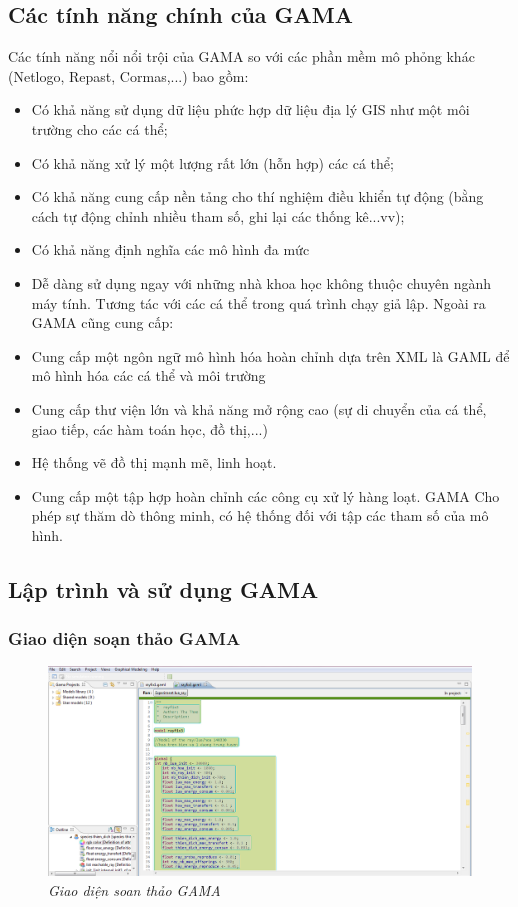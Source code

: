 \documentclass[13pt]{extreport}
\begin{document}
\subsection{Các tính năng chính của GAMA}
\indent Các tính năng nổi nổi trội của GAMA so với các phần mềm mô phỏng khác (Netlogo, Repast, Cormas,...) bao gồm:
\begin{itemize}
\item Có khả năng sử dụng dữ liệu phức hợp dữ liệu địa lý GIS như một môi trường cho các cá thể;
\item Có khả năng xử lý một lượng rất lớn (hỗn hợp) các cá thể;
\item Có khả năng cung cấp nền tảng cho thí nghiệm điều khiển tự động (bằng cách tự động chỉnh nhiều tham số, ghi lại các thống kê...vv);
\item Có khả năng định nghĩa các mô hình đa mức
\item Dễ dàng sử dụng ngay với những nhà khoa học không thuộc chuyên ngành máy tính. Tương tác với các cá thể trong quá trình chạy giả lập.
Ngoài ra GAMA cũng cung cấp:
\item Cung cấp một ngôn ngữ mô hình hóa hoàn chỉnh dựa trên XML là GAML để mô hình hóa các cá thể và môi trường
\item Cung cấp thư viện lớn và khả năng mở rộng cao (sự di chuyển của cá thể, giao tiếp, các hàm toán học, đồ thị,...)
\item Hệ thống vẽ đồ thị mạnh mẽ, linh hoạt.
\item Cung cấp một tập hợp hoàn chỉnh các công cụ xử lý hàng loạt. GAMA Cho phép sự thăm dò thông minh, có hệ thống đối với tập các tham số của mô hình.
\end{itemize}

\subsection{Lập trình và sử dụng GAMA}
\subsubsection*{Giao diện soạn thảo GAMA}
\begin{figure}
\begin{center}
\includegraphics[scale=0.4]{khung_gama}
\end{center}
\caption{\textit{ Giao diện soan thảo GAMA}}
\end{figure}
\end{document}
